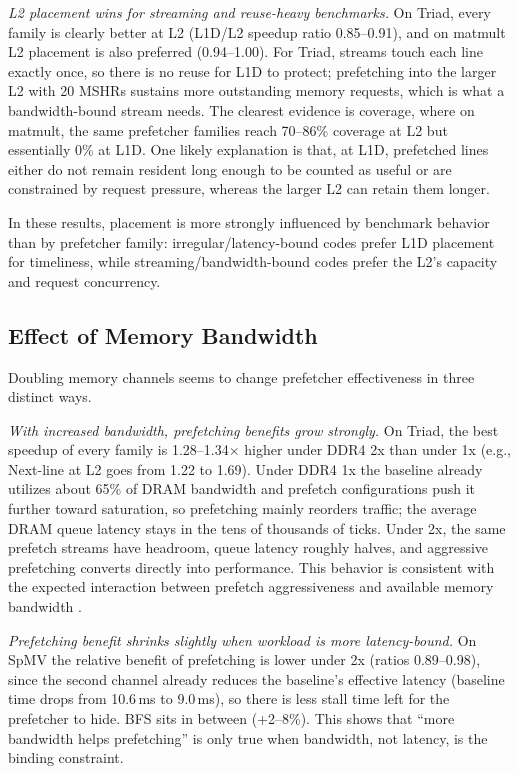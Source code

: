 \documentclass[12pt, letterpaper]{article}
\begin{document}
\noindent \emph{L2 placement wins for streaming and reuse-heavy benchmarks.} On Triad, every family is clearly better at L2 (L1D/L2 speedup ratio 0.85--0.91), and on matmult L2 placement is also preferred (0.94--1.00). For Triad, streams touch each line exactly once, so there is no reuse for L1D to protect; prefetching into the larger L2 with 20 MSHRs sustains more outstanding memory requests, which is what a bandwidth-bound stream needs. The clearest evidence is coverage, where on matmult, the same prefetcher families reach 70--86\% coverage at L2 but essentially 0\% at L1D. One likely explanation is that, at L1D, prefetched lines either do not remain resident long enough to be counted as useful or are constrained by request pressure, whereas the larger L2 can retain them longer.

\noindent In these results, placement is more strongly influenced by benchmark behavior than by prefetcher family: irregular/latency-bound codes prefer L1D placement for timeliness, while streaming/bandwidth-bound codes prefer the L2's capacity and request concurrency.

\subsection{Effect of Memory Bandwidth}
\label{sec:res:memory}

Doubling memory channels seems to change prefetcher effectiveness in three distinct ways.

\noindent\emph{With increased bandwidth, prefetching benefits grow strongly.} On Triad, the best speedup of every family is 1.28--1.34$\times$ higher under DDR4 2x than under 1x (e.g., Next-line at L2 goes from 1.22 to 1.69). Under DDR4 1x the baseline already utilizes about 65\% of DRAM bandwidth and prefetch configurations push it further toward saturation, so prefetching mainly reorders traffic; the average DRAM queue latency stays in the tens of thousands of ticks. Under 2x, the same prefetch streams have headroom, queue latency roughly halves, and aggressive prefetching converts directly into performance. This behavior is consistent with the expected interaction between prefetch aggressiveness and available memory bandwidth \cite{fzj-hybrid-pf}.

\noindent\emph{Prefetching benefit shrinks slightly when workload is more latency-bound.} On SpMV the relative benefit of prefetching is lower under 2x (ratios 0.89--0.98), since the second channel already reduces the baseline's effective latency (baseline time drops from 10.6\,ms to 9.0\,ms), so there is less stall time left for the prefetcher to hide. BFS sits in between (+2--8\%). This shows that ``more bandwidth helps prefetching'' is only true when bandwidth, not latency, is the binding constraint.
\end{document}

